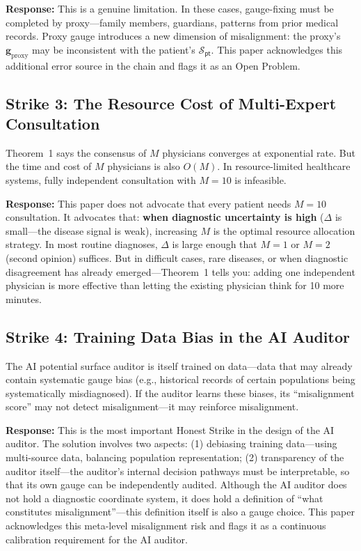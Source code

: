 \documentclass[12pt,a4paper]{article}
\theoremstyle{remark}
\newcommand{\pt}{\textsf{pt}}
\begin{document}
\textbf{Response:} This is a genuine limitation. In these cases, gauge-fixing must be completed by proxy---family members, guardians, patterns from prior medical records. Proxy gauge introduces a new dimension of misalignment: the proxy's $\mathbf{g}_{\text{proxy}}$ may be inconsistent with the patient's $\mathcal{S}_{\pt}$. This paper acknowledges this additional error source in the chain and flags it as an Open Problem.

\subsection{Strike 3: The Resource Cost of Multi-Expert Consultation}

Theorem~1 says the consensus of $M$ physicians converges at exponential rate. But the time and cost of $M$ physicians is also $O(M)$. In resource-limited healthcare systems, fully independent consultation with $M=10$ is infeasible.

\textbf{Response:} This paper does not advocate that every patient needs $M=10$ consultation. It advocates that: \textbf{when diagnostic uncertainty is high} ($\Delta$ is small---the disease signal is weak), increasing $M$ is the optimal resource allocation strategy. In most routine diagnoses, $\Delta$ is large enough that $M=1$ or $M=2$ (second opinion) suffices. But in difficult cases, rare diseases, or when diagnostic disagreement has already emerged---Theorem~1 tells you: adding one independent physician is more effective than letting the existing physician think for 10 more minutes.

\subsection{Strike 4: Training Data Bias in the AI Auditor}

The AI potential surface auditor is itself trained on data---data that may already contain systematic gauge bias (e.g., historical records of certain populations being systematically misdiagnosed). If the auditor learns these biases, its ``misalignment score'' may not detect misalignment---it may reinforce misalignment.

\textbf{Response:} This is the most important Honest Strike in the design of the AI auditor. The solution involves two aspects: (1) debiasing training data---using multi-source data, balancing population representation; (2) transparency of the auditor itself---the auditor's internal decision pathways must be interpretable, so that its own gauge can be independently audited. Although the AI auditor does not hold a diagnostic coordinate system, it does hold a definition of ``what constitutes misalignment''---this definition itself is also a gauge choice. This paper acknowledges this meta-level misalignment risk and flags it as a continuous calibration requirement for the AI auditor.
\end{document}
